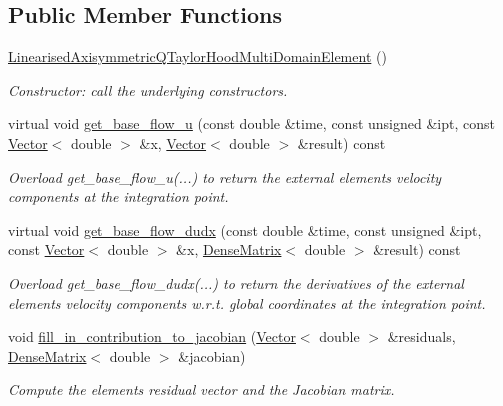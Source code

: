 \subsection*{Public Member Functions}
\begin{DoxyCompactItemize}
\item 
\hyperlink{classLinearisedAxisymmetricQTaylorHoodMultiDomainElement_a8701f82f9da337ea29066af244c8922f}{Linearised\+Axisymmetric\+Q\+Taylor\+Hood\+Multi\+Domain\+Element} ()
\begin{DoxyCompactList}\small\item\em Constructor\+: call the underlying constructors. \end{DoxyCompactList}\item 
virtual void \hyperlink{classLinearisedAxisymmetricQTaylorHoodMultiDomainElement_a4e583d2145c56f10d26fdc8527128b54}{get\+\_\+base\+\_\+flow\+\_\+u} (const double \&time, const unsigned \&ipt, const \hyperlink{classoomph_1_1Vector}{Vector}$<$ double $>$ \&x, \hyperlink{classoomph_1_1Vector}{Vector}$<$ double $>$ \&result) const
\begin{DoxyCompactList}\small\item\em Overload get\+\_\+base\+\_\+flow\+\_\+u(...) to return the external element\textquotesingle{}s velocity components at the integration point. \end{DoxyCompactList}\item 
virtual void \hyperlink{classLinearisedAxisymmetricQTaylorHoodMultiDomainElement_a88bdf14ec298be7083e97d0312d7e968}{get\+\_\+base\+\_\+flow\+\_\+dudx} (const double \&time, const unsigned \&ipt, const \hyperlink{classoomph_1_1Vector}{Vector}$<$ double $>$ \&x, \hyperlink{classoomph_1_1DenseMatrix}{Dense\+Matrix}$<$ double $>$ \&result) const
\begin{DoxyCompactList}\small\item\em Overload get\+\_\+base\+\_\+flow\+\_\+dudx(...) to return the derivatives of the external element\textquotesingle{}s velocity components w.\+r.\+t. global coordinates at the integration point. \end{DoxyCompactList}\item 
void \hyperlink{classLinearisedAxisymmetricQTaylorHoodMultiDomainElement_adc20fbe7a713cb4b1d80c750698416ed}{fill\+\_\+in\+\_\+contribution\+\_\+to\+\_\+jacobian} (\hyperlink{classoomph_1_1Vector}{Vector}$<$ double $>$ \&residuals, \hyperlink{classoomph_1_1DenseMatrix}{Dense\+Matrix}$<$ double $>$ \&jacobian)
\begin{DoxyCompactList}\small\item\em Compute the element\textquotesingle{}s residual vector and the Jacobian matrix. \end{DoxyCompactList}\end{DoxyCompactItemize}
